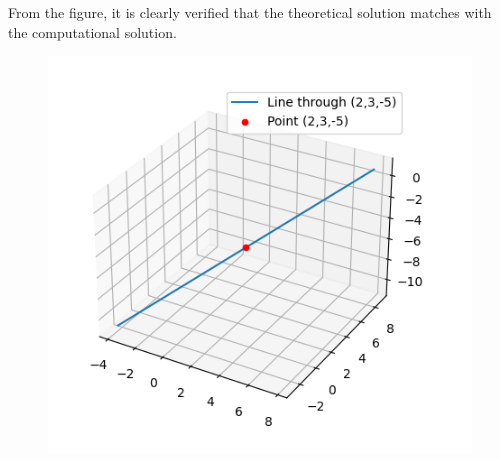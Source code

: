 \documentclass[journal]{IEEEtran}
\begin{document}
From the figure, it is clearly verified that the theoretical solution matches with the computational solution.
\begin{figure}[h!]
    \centering
    \includegraphics[height=0.5\textheight, keepaspectratio]{figs/fig.png}
\end{figure}
\end{document}
